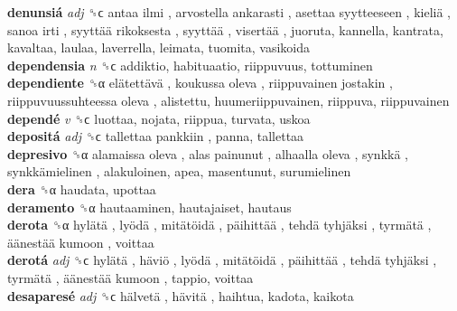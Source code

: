 \textbf{denunsiá} \emph{adj}  ␝ϲ   antaa ilmi ,  arvostella ankarasti ,  asettaa syytteeseen ,  kieliä ,  sanoa irti ,  syyttää rikoksesta ,  syyttää ,  visertää , juoruta, kannella, kantrata, kavaltaa, laulaa, laverrella, leimata, tuomita, vasikoida  \\
\textbf{dependensia} \emph{n}  ␝ϲ  addiktio, habituaatio, riippuvuus, tottuminen  \\
\textbf{dependiente} ␝α   elätettävä ,  koukussa oleva ,  riippuvainen jostakin ,  riippuvuussuhteessa oleva , alistettu, huumeriippuvainen, riippuva, riippuvainen  \\
\textbf{dependé} \emph{v}  ␝ϲ  luottaa, nojata, riippua, turvata, uskoa  \\
\textbf{depositá} \emph{adj}  ␝ϲ   tallettaa pankkiin , panna, tallettaa  \\
\textbf{depresivo} ␝α   alamaissa oleva ,  alas painunut ,  alhaalla oleva ,  synkkä ,  synkkämielinen , alakuloinen, apea, masentunut, surumielinen  \\
\textbf{dera} ␝α  haudata, upottaa  \\
\textbf{deramento} ␝α  hautaaminen, hautajaiset, hautaus  \\
\textbf{derota} ␝α   hylätä ,  lyödä ,  mitätöidä ,  päihittää ,  tehdä tyhjäksi ,  tyrmätä ,  äänestää kumoon , voittaa  \\
\textbf{derotá} \emph{adj}  ␝ϲ   hylätä ,  häviö ,  lyödä ,  mitätöidä ,  päihittää ,  tehdä tyhjäksi ,  tyrmätä ,  äänestää kumoon , tappio, voittaa  \\
\textbf{desaparesé} \emph{adj}  ␝ϲ   hälvetä ,  hävitä , haihtua, kadota, kaikota  \\
